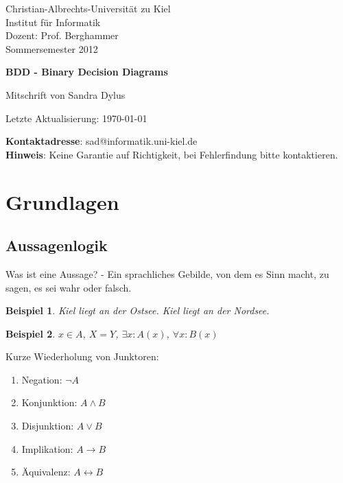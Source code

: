 \documentclass[ngerman]{scrartcl}
\theoremstyle{custom}
\newtheorem*{ex}{Beispiel}
\newcommand{\0}{\mathbf{0}}
\newcommand{\1}{\mathbf{L}}
\begin{document}
\begin{titlepage}
\thispagestyle{empty}
\begin{small}
\vfill {Christian-Albrechts-Universit\"at zu Kiel\\ 
Institut f\"ur Informatik \\ 
Dozent: Prof. Berghammer\\
Sommersemester 2012}
\end{small}

\vspace{5cm}
\begin{center}
\begin{Large}
 {\textsf{\textbf{BDD - Binary Decision Diagrams
}}}
\end{Large}

\vspace{1cm}
Mitschrift von Sandra Dylus
\end{center}
\begin{small}
\begin{center}
Letzte Aktualisierung: \today
\end{center}
\end{small}
\vfill

\begin{small} 
\textbf{Kontaktadresse}: sad@informatik.uni-kiel.de\\
\textbf{Hinweis}: Keine Garantie auf Richtigkeit, bei Fehlerfindung bitte kontaktieren.
\end{small}

\end{titlepage}
\tableofcontents
\newpage

\section{Grundlagen}
\subsection{Aussagenlogik}
Was ist eine Aussage? - Ein sprachliches Gebilde, von dem es
Sinn macht, zu sagen, es sei wahr oder falsch.

\begin{ex} Kiel liegt an der Ostsee. Kiel liegt an der Nordsee.\end{ex}
\begin{ex} $x \in A$, $X=Y$, $\exists x: A(x)$, $\forall x :
  B(x)$\end{ex}

Kurze Wiederholung von Junktoren:
\begin{enumerate}
\item Negation: $\neg A$
\item Konjunktion: $A \wedge B$
\item Disjunktion: $A \vee B$
\item Implikation: $A \rightarrow B$
\item \"Aquivalenz: $A \leftrightarrow B$
\end{enumerate}
\end{document}
